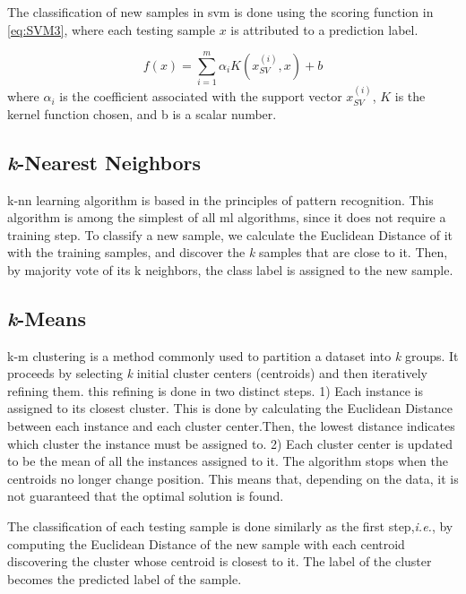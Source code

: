The classification of new samples in \ac{svm} is done using the scoring function in \ref{eq:SVM3}, where each testing sample $x$ is attributed to a prediction label.

\begin{equation}
\label{eq:SVM3}
f(x)=\sum_{i=1}^m \alpha_i K (x_{SV}^{(i)},x)+b
\end{equation}
where $\alpha_i$ is the coefficient associated with the support vector $x_{SV}^{(i)}$, $K$ is the kernel function chosen, and b is a scalar number.


\subsection{\textit{k}-Nearest Neighbors}
\label{ssec:kNearestNeighbors}

\ac{k-nn} learning algorithm is based in the principles of pattern recognition. This algorithm is among the simplest of all \ac{ml} algorithms, since it does not require a training step. To classify a new sample, we calculate the Euclidean Distance of it with the training samples, and discover the \textit{k} samples that are close to it. Then, by majority vote of its {k} neighbors, the class label is assigned to the new sample.


\subsection{\textit{k}-Means}
\label{ssec:kMeans}

\ac{k-m} clustering is a method commonly used to partition a dataset into \textit{k} groups. It proceeds by selecting \textit{k} initial cluster centers (centroids) and then iteratively refining them. this refining is done in two distinct steps. 1) Each instance is assigned to its closest cluster. This is done by calculating the Euclidean Distance between each instance and each cluster center.Then, the lowest distance indicates which cluster the instance must be assigned to. 2) Each cluster center is updated to be the mean of all the instances assigned to it.
The algorithm stops when the centroids no longer change position. This means that, depending on the data, it is not guaranteed that the optimal solution is found.

The classification of each testing sample is done similarly as the first step,\textit{i.e.}, by computing the Euclidean Distance of the new sample with each centroid discovering the cluster whose centroid is closest to it. The label of the cluster becomes the predicted label of the sample.



